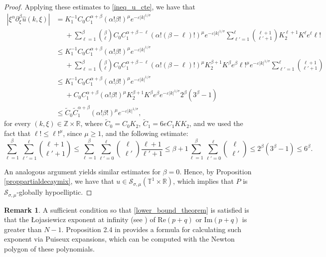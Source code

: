 \documentclass[11pt,reqno]{amsart}
\numberwithin{equation}{section}
\theoremstyle{definition}
\newtheorem{obs}{Remark}
\theoremstyle{definition}
\newcommand{\T}{\mathbb{T}}
\newcommand{\G}{\mathnormal{\mathbb{T}^{m}\times\mathbb{R}^n}}
\newcommand{\R}{\mathbb{R}}
\newcommand{\Z}{\mathbb{Z}}
\newcommand{\s}{\mathcal{S}(\G)}
\newcommand{\Real}{\mathrm{Re}}
\newcommand{\Imag}{\mathrm{Im}}
\renewcommand{\s}{\mathcal{S}_{\sigma,\mu}(\T^1\times\R)}
\begin{document}
\begin{proof}
Applying these estimates to \eqref{ineq_u_cte}, we have that
\begin{align*}
     |\xi^\alpha\partial_\xi^\beta\widehat{u}(k,\xi)| &=K_1^{-1}C_0C_1^{\alpha+\beta}(\alpha!\beta!)^\mu e^{-\varepsilon|k|^{1/\sigma}}\\
    &\phantom{=}+\sum_{\ell=1}^\beta \binom{\beta}{\ell}C_0C_1^{\alpha+\beta-\ell}(\alpha!(\beta-\ell)!)^\mu e^{-\varepsilon|k|^{1/\sigma}}\sum_{\ell'=1}^{\ell}\binom{\ell+1}{\ell'+1}K_2^{\ell+1} K^\ell e^\ell \ell!\\
    &\leq K_1^{-1}C_0C_1^{\alpha+\beta}(\alpha!\beta!)^\mu e^{-\varepsilon|k|^{1/\sigma}}\\
    &\phantom{=}+\sum_{\ell=1}^\beta \binom{\beta}{\ell}C_0C_1^{\alpha+\beta-\ell}(\alpha!(\beta-\ell)!)^\mu K_2^{\beta+1} K^\beta e^\beta \ell!^\mu e^{-\varepsilon|k|^{1/\sigma}}\sum_{\ell'=1}^{\ell}\binom{\ell+1}{\ell'+1}\\
    &\leq K_1^{-1}C_0C_1^{\alpha+\beta}(\alpha!\beta!)^\mu e^{-\varepsilon|k|^{1/\sigma}}\\
    &\phantom{=}+C_0C_1^{\alpha+\beta}(\alpha!\beta!)^\mu K_2^{\beta+1} K^\beta e^\beta e^{-\varepsilon|k|^{1/\sigma}}2^\beta  (3^\beta-1)\\
    &\leq \tilde C_0\tilde C_1^{\alpha+\beta}(\alpha!\beta!)^\mu e^{-\varepsilon|k|^{1/\sigma}},
\end{align*}
for every $(k,\xi)\in\Z\times \R$, where $\tilde C_0= C_0K_2$, $\tilde C_1= 6eC_1KK_2$, and we used the fact that $\ell!\leq \ell!^\mu$, since $\mu\geq 1$, and the following estimate:
\begin{equation*}
    \sum_{\ell=1}^\beta\sum_{\ell'=1}^{\ell}\binom{\ell+1}{\ell'+1}\leq  \sum_{\ell=1}^\beta\sum_{\ell'=0}^{\ell}\binom{\ell}{\ell'}\frac{\ell+1}{\ell'+1}\leq \beta+1\sum_{\ell=1}^\beta\sum_{\ell'=0}^{\ell}\binom{\ell}{\ell'}\leq 2^\beta  (3^\beta-1) \leq 6^\beta.
\end{equation*}
     
    An analogous argument yields similar estimates for $\beta=0$.
    Hence, by Proposition \ref{proppartialdecaymix}, we have that $u\in\s$, which implies that $P$ is $\mathcal{S}_{\sigma,\mu}$-globally hypoelliptic.
\end{proof}

\begin{obs}
    A sufficient condition so that  \eqref{lower_bound_theorem} is satisfied is that the \L ojasiewicz exponent at infinity (see \cite{zbMATH05257541}) of $\Real(p+q)$ or $\Imag(p+q)$ is greater than $N-1$. Proposition 2.4 in \cite{zbMATH05789579} provides a formula for calculating such exponent via Puiseux expansions, which can be computed with the Newton polygon of these polynomials.
\end{obs}
\end{document}
